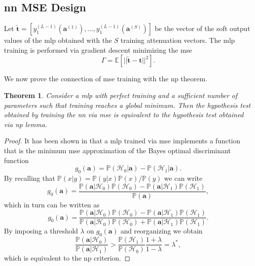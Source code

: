 \documentclass[draftcls,onecolumn,12pt]{IEEEtran}
\newtheorem{theorem}{Theorem}
\begin{document}
\subsection{\ac{nn} MSE Design}
\label{sec: mse_train}

Let $\tilde{\bm{t}} = [y_1^{(L-1)}(\bm{a}^{(1)}), \ldots,  y_1^{(L-1)}(\bm{a}^{(S)})]$ be the vector of the soft output values of the \ac{mlp}  obtained with the $S$ training attenuation vectors. The \ac{mlp} training is performed via gradient descent minimizing the \ac{mse} 
\begin{equation}
\Gamma = \mathbb{E}[||\tilde{\bm{t}}-\bm{t}||^2].
\end{equation}

We now prove the connection of \ac{mse} training with the \ac{np} theorem.
\begin{theorem}
\label{th:nn_np}
Consider a \ac{mlp} with perfect training and a sufficient number of parameters such that training reaches a global minimum. Then the hypothesis test obtained by training the \ac{nn} via \ac{mse} is equivalent to the hypothesis test obtained via \ac{np} lemma.
\end{theorem}
\begin{proof}
It has been shown in \cite{Ruck-90} that a \ac{mlp} trained via \ac{mse} implements a function that is the minimum \ac{mse} approximation of the Bayes optimal discriminant function
\begin{equation}\label{eq:bayesDisc}
g_0(\bm{a}) = \mathbb{P}(\mathcal{H}_0|\bm{a}) - \mathbb{P}(\mathcal{H}_1|\bm{a}).
\end{equation} 
By recalling that $\mathbb{P}(x|y)=\mathbb{P}(y|x)\mathbb{P}(x)/\mathbb{P}(y)$ we can write
\begin{equation}
g_0(\bm{a}) = \frac{{\mathbb P}(\bm{a}|\mathcal H_0){\mathbb P}(\mathcal H_0) - {\mathbb P}(\bm{a}|\mathcal H_1){\mathbb P}(\mathcal H_1)}{\mathbb P(\bm{a})},
\end{equation}
which in turn can be written as
\begin{equation}
g_0(\bm{a}) = \frac{{\mathbb P}(\bm{a}|\mathcal H_0){\mathbb P}(\mathcal H_0) - {\mathbb P}(\bm{a}|\mathcal H_1){\mathbb P}(\mathcal H_1)}{{\mathbb P}(\bm{a}|\mathcal H_0){\mathbb P}(\mathcal H_0) + {\mathbb P}(\bm{a}|\mathcal H_1){\mathbb P}(\mathcal H_1)}.
\end{equation}
By imposing a threshold $\lambda$ on $g_0(\bm{a})$ and reorganizing we obtain
\begin{equation}
\frac{{\mathbb P}(\bm{a}|\mathcal H_0)}{{\mathbb P}(\bm{a}|\mathcal H_1)}>   \frac{{\mathbb P}(\mathcal H_1)}{{\mathbb P}(\mathcal H_0)} \frac{1 + \lambda}{1-\lambda} = \lambda^*,
\end{equation}
which is equivalent to the \ac{np} criterion.
\end{proof}
\end{document}
